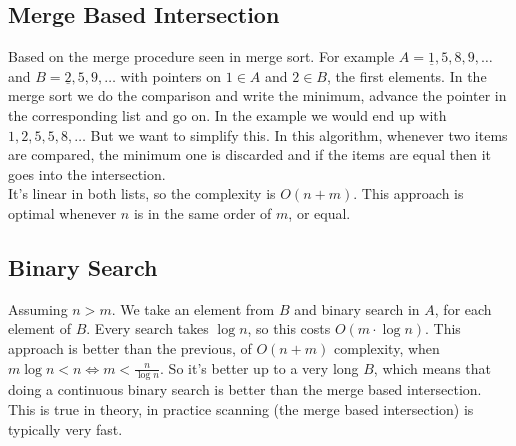 \documentclass[10pt]{report}
\begin{document}
\subsection{Merge Based Intersection}
Based on the merge procedure seen in merge sort. For example $A = \underline{1},5,8,9,\ldots$ and $B = \underline{2}, 5, 9,\ldots$ with pointers on $1\in A$ and $2\in B$, the first elements. In the merge sort we do the comparison and write the minimum, advance the pointer in the corresponding list and go on. In the example we would end up with $1, 2, 5, 5, 8,\ldots$ But we want to simplify this. In this algorithm, whenever two items are compared, the minimum one is discarded and if the items are equal then it goes into the intersection.\\
It's linear in both lists, so the complexity is $O(n + m)$. This approach is optimal whenever $n$ is in the same order of $m$, or equal.
\subsection{Binary Search} Assuming $n > m$. We take an element from $B$ and binary search in $A$, for each element of $B$. Every search takes $\log n$, so this costs $O(m\cdot\log n)$. This approach is better than the previous, of $O(n + m)$ complexity, when $m\log n < n \Leftrightarrow m < \frac{n}{\log n}$. So it's better up to a very long $B$, which means that doing a continuous binary search is better than the merge based intersection.\\
This is true in theory, in practice scanning (the merge based intersection) is typically very fast.
\end{document}
